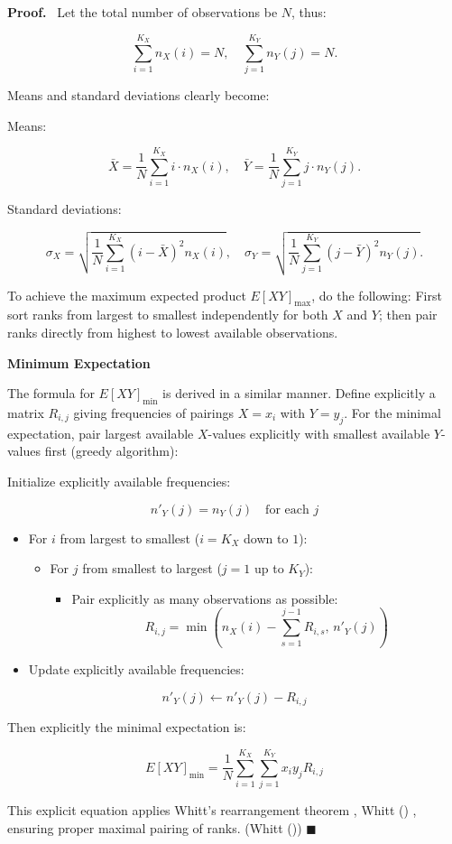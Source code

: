 \documentclass[
  12pt,
]{article}
\providecommand{\tightlist}{%
  \setlength{\itemsep}{0pt}\setlength{\parskip}{0pt}}\usepackage{longtable,booktabs,array}
\theoremstyle{plain}
\theoremstyle{definition}
\renewenvironment{proof}
   {\par\noindent\textbf{Proof.}\ }
   {\hfill$\blacksquare$\par}
\theoremstyle{remark}
\begin{document}
\begin{proof}
Let the total number of observations be \(N\), thus:

\[\sum_{i=1}^{K_X} n_{X}(i) = N,\quad \sum_{j=1}^{K_Y} n_{Y}(j) = N.\]

Means and standard deviations clearly become:

Means:

\[
\bar{X} = \frac{1}{N}\sum_{i=1}^{K_X} i \cdot n_X(i),\quad  
    \bar{Y} = \frac{1}{N}\sum_{j=1}^{K_Y} j \cdot n_Y(j).
\]

Standard deviations:

\[
\sigma_X = \sqrt{\frac{1}{N}\sum_{i=1}^{K_X} (i - \bar{X})^2 n_X(i)},\quad  
    \sigma_Y = \sqrt{\frac{1}{N}\sum_{j=1}^{K_Y} (j - \bar{Y})^2 n_Y(j)}.
\]

To achieve the maximum expected product \(E[XY]_{\text{max}}\), do the
following: First sort ranks from largest to smallest independently for
both \(X\) and \(Y\); then pair ranks directly from highest to lowest
available observations.

\textbf{Minimum Expectation}

The formula for \(E[XY]_{\text{min}}\) is derived in a similar manner.
Define explicitly a matrix \(R_{i,j}\) giving frequencies of pairings
\(X=x_i\) with \(Y=y_j\). For the minimal expectation, pair largest
available \(X\)-values explicitly with smallest available \(Y\)-values
first (greedy algorithm):

Initialize explicitly available frequencies:

\[n'_Y(j)=n_Y(j)\quad\text{for each }j\]

\begin{itemize}
\item
  For \(i\) from largest to smallest (\(i=K_X\) down to \(1\)):

  \begin{itemize}
  \tightlist
  \item
    For \(j\) from smallest to largest (\(j=1\) up to \(K_Y\)):

    \begin{itemize}
    \tightlist
    \item
      Pair explicitly as many observations as possible:
      \[R_{i,j}=\min\left(n_X(i)-\sum_{s=1}^{j-1}R_{i,s},\, n'_Y(j)\right)\]
    \end{itemize}
  \end{itemize}
\item
  Update explicitly available frequencies:
\end{itemize}

\[n'_Y(j)\leftarrow n'_Y(j)-R_{i,j}\]

Then explicitly the minimal expectation is:

\[E[XY]_{\text{min}}=\frac{1}{N}\sum_{i=1}^{K_X}\sum_{j=1}^{K_Y} x_i y_j R_{i,j}\]

This explicit equation applies Whitt's rearrangement theorem , Whitt
() , ensuring proper maximal
pairing of ranks. (Whitt ())
\end{proof}
\end{document}
